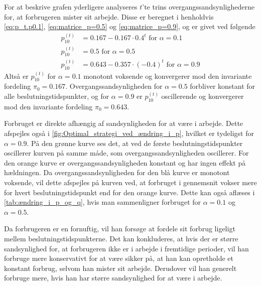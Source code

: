
For at beskrive grafen yderligere analyseres $t$'te trins overgangssandsynlighederne for, at forbrugeren mister sit arbejde. Disse er beregnet i henholdvis \eqref{eq:p_t.p0.1}, \eqref{eq:matrice_p=0.5} og \eqref{eq:matrice_p=0.9}, og er givet ved følgende
\begin{align*}
    p_{10}^{(t)}&=0.167-0.167\cdot 0.4^t \text{ for } \alpha=0.1\\
    p_{10}^{(t)} &= 0.5 \text{ for } \alpha = 0.5\\
    p_{10}^{(t)} &= 0.643 - 0.357 \cdot (-0.4)^t \text{ for } \alpha=0.9
\end{align*}
Altså er $p_{10}^{(t)}$ for $\alpha=0.1$ monotont voksende og konvergerer mod den invariante fordeling $\pi_0 = 0.167$. Overgangssandsynligheden for $\alpha=0.5$ forbliver konstant for alle beslutningstidspunkter, og for $\alpha=0.9$ er $p^{(t)}_{10}$ oscillerende og konvergerer mod den invariante fordeling $\pi_0=0.643$. 

Forbruget er direkte afhængig af sandsynligheden for at være i arbejde. Dette afspejles også i \autoref{fig:Optimal_strategi_ved_ændring_i_p}, hvilket er tydeligst for $\alpha=0.9$. På den grønne kurve ses det, at ved de første beslutningstidspunkter oscillerer kurven på samme måde, som overgangssandsynligheden oscillerer. For den orange kurve er overgangssandsynligheden konstant og har ingen effekt på hældningen. Da overgangssandsynligheden for den blå kurve er monotont voksende, vil dette afspejles på kurven ved, at forbruget i gennemsnit vokser mere for hvert beslutningstidspunkt end for den orange kurve. Dette kan også aflæses i \autoref{tab:ændring_i_p_og_q}, hvis man sammenligner forbruget for $\alpha=0.1$ og $\alpha=0.5$. 

Da forbrugeren er en fornuftig, vil han forsøge at fordele sit forbrug ligeligt mellem beslutningstidspunkterne. Det kan konkluderes, at hvis der er større sandsynlighed for, at forbrugeren ikke er i arbejde i fremtidige perioder, vil han forbruge mere konservativt for at være sikker på, at han kan opretholde et konstant forbrug, selvom han mister sit arbejde.
Derudover vil han generelt forbruge mere, hvis han har større sandsynlighed for at være i arbejde. 








